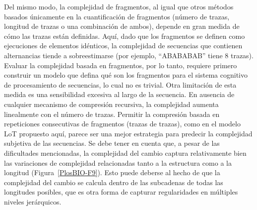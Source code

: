 
Del mismo modo, la complejidad de fragmentos, al igual que otros métodos basados únicamente en la cuantificación de fragmentos (número de trazas, longitud de trazas o una combinación de ambos), depende en gran medida de cómo las trazas están definidas. Aquí, dado que los fragmentos se definen como ejecuciones de elementos idénticos, la complejidad de secuencias que contienen alternancias tiende a sobreestimarse (por ejemplo, ``ABABABAB'' tiene 8 trazas). Evaluar la complejidad basada en fragmentos, por lo tanto, requiere primero construir un modelo que defina qué son los fragmentos para el sistema cognitivo de procesamiento de secuencias, lo cual no es trivial. Otra limitación de esta medida es una sensibilidad excesiva al largo de la secuencia. En ausencia de cualquier mecanismo de compresión recursiva, la complejidad aumenta linealmente con el número de trazas. Permitir la compresión basada en repeticiones consecutivas de fragmentos (trazas de trazas), como en el modelo LoT propuesto aquí, parece ser una mejor estrategia para predecir la complejidad subjetiva de las secuencias. Se debe tener en cuenta que, a pesar de las dificultades mencionadas, la complejidad del cambio captura relativamente bien las variaciones de complejidad relacionadas tanto a la estructura como a la longitud (Figura~\ref{PlosBIO-F9}). Esto puede deberse al hecho de que la complejidad del cambio se calcula dentro de las subcadenas de todas las longitudes posibles, que es otra forma de capturar regularidades en múltiples niveles jerárquicos.

